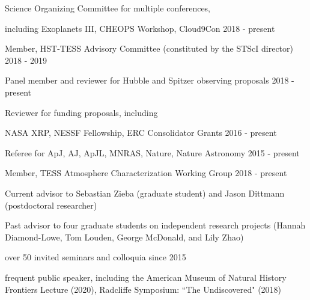 \documentclass[12pt,letterpaper]{article}
\begin{document}

\begin{list}{}{\cvlist}
    \item Science Organizing Committee for multiple conferences, 
            \begin{sloppypar}
            including Exoplanets III, CHEOPS Workshop, Cloud9Con \hfill 2018 - present
            \end{sloppypar}
    \item Member, HST-TESS Advisory Committee (constituted by the STScI director) \hfill 2018 - 2019
    \item Panel member and reviewer for Hubble and Spitzer observing proposals \hfill 2018 - present
    \item Reviewer for funding proposals, including
            \begin{sloppypar}
            NASA XRP, NESSF Fellowship, ERC Consolidator Grants \hfill 2016 - present
            \end{sloppypar}
    \item Referee for ApJ, AJ, ApJL, MNRAS, Nature, Nature Astronomy \hfill 2015 - present
    \item {Member, TESS Atmosphere Characterization Working Group \hfill 2018 - present}
\end{list}


\begin{list}{}{\cvlist}
\item Current advisor to Sebastian Zieba (graduate student)  and Jason Dittmann (postdoctoral researcher)
\item Past advisor to four graduate students on independent research projects (Hannah Diamond-Lowe, Tom Louden, George McDonald, and Lily Zhao)
\end{list}



\begin{list}{}{\cvlist}
\item over 50 invited seminars and colloquia since 2015 
\item frequent public speaker, including the
    American Museum of Natural History Frontiers Lecture (2020), Radcliffe Symposium: ``The Undiscovered" (2018)
\end{list}





\end{document}
